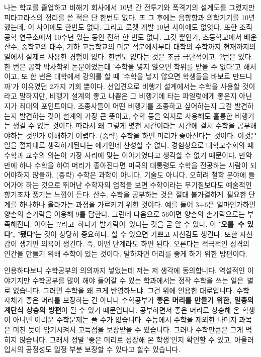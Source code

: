 나는 학교를 졸업하고 비해기 회사에서 10년 간 전투기와 폭격기의 설계도를 그렸지만 피타고라스의 정리를 쓴 적은 단 한번도 없다. 또 그 후에는 음향항과 의학기기를 10년 했는데, 이 사이에도 한번도 없다. 그리고 로켓 개발 10년 사이에도 없엇다. 또한 조직공학 연구소에서 10수년 있는 동안 전혀 한 번도 없다. 그것 뿐인가, 초등학교에서 배운 산수, 중학교의 대수, 기하 고등학교의 미분 적분에서부터 대학의 수학까지 현재까지의 일에서 실제로 사용한 경험이 없다.
한번도 없다는 것은 조금 극단적이고, 2번은 있다. 한 번은 공학 박사학위 논문이었는데 '수학을 넣지 않으면 학위를 받을 수 없다'고 해서이고, 또 한 번은 대학에서 강의를 할 때 '수학을 넣지 않으면 학생들을 바보로 만드니까'가 이유였던 2가지 기회 뿐이다.
선입견으로 비행기 설계에서는 수학을 사용할 것이라고 말하지만, 비행기 설계의 좋고 나쁨은 그 비행기에 타는 파일럿에게 좋은지 아닌지가 최대의 포인트이다. 조종사들이 어떤 비행기를 조종하고 싶어하는지 그걸 발견하는지 발견하는 것이 설계의 가장 큰 뜻이고, 수학 등을 억지로 사용해도 훌륭한 비행기는 생길 수 없는 것이다. 따라서 왜 그렇게 몇천 시간이라는 시간에 걸쳐 수학을 공부해야하는 것인가 이해하기 어렵다.
(중략)
수학을 하면 머리가 좋아진다는 것이다. 이것은 일을 절차대로 생각하게된다는 얘기인데 찬성할 수 없다. 경험상으로 대학교수회의 때 수학과 교수의 의논이 가장 사리에 맞는 이야기였다고 생각할 수 없기 때문이다. 만약 만에 하나 수학을 하여 머리가 좋아진다면 미국의 대통령도 수학을 전공하는 사람이 되어야하지 않을까.
(중략)
수학은 과학이 아니다. 기술도 아니다. 오히려 철학 분야에 들어가야 하는 것으로 뛰어난 수학자의 업적을 보면 수학이라는 무기질보다도 예술적인 향기조차 풍기는 느낌이 든다. 산수, 수학을 공부하는 것은 절대 불가결하게 필요한 단계를 하나하나 올라가는 과정을 가르키기 위한 것이다. 예를 들어 3+6은 얼마인가하면 양손의 손가락을 이용해 9를 답한다. 그런데 다음으로 56이면 양손의 손가락으로는 부족해진다. 아이는 !?라고 하다가 발가락이 있다는 것을 곧 알 수 있다. 이 \textbf{'오를 수 있다', '됐다'}는 것이 상당히 중요하다. 할 수 있으면 기쁘고 자신감도 생긴다. 또한 자신감이 생기면 의욕이 생긴다. 즉, 어떤 단계라도 하면 된다.
오른다는 적극적인 성격의 인간을 만들기 위해 수학이 있는 것이다. 말하자면 머리를 좋게 하기 위한 방편이다.
\vspace{5mm}

인용하다보니 수학공부의 의의까지 넣었는데 저는 저 생각에 동의합니다.
역설적인 이야기지만 수학공부를 많이 해야 들어갈 수 있는 학과에서는 정작 수학을 쓰는 일은 별로 없습니다.
그러면 수학을 왜 크게 반영하느냐. 그건 위에 인용한 대로입니다. 수학 자체가 좋은 머리를 보장하는 건 아니나
수학공부가 \textbf{좋은 머리를 만들기 위한, 일종의 계단식 상승의 방편}이 될 수 있기 때문입니다.
공부하면서 좋은 머리로 상승해 온 학생이 아니면 어려운 수학문제는 풀 수가 없습니다.
수능에서 수학을 제외한 나머지 과목은 미친 듯이 암기시켜서 고득점을 보장받을 수 있습니다.
그러나 수학만큼은 그게 먹히지 않습니다. 그래서 정말 '좋은 머리로 성장해 온 학생'인지 확인할 수 있고,
아울러 입시의 공정성도 일정 부분 보장할 수 있다고 할수 있습니다.
\vspace{5mm}

